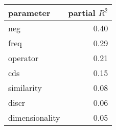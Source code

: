 \begin{tabular}{lr}
\toprule
      parameter &  partial $R^2$ \\
\midrule
            neg &           0.40 \\
           freq &           0.29 \\
       operator &           0.21 \\
            cds &           0.15 \\
     similarity &           0.08 \\
          discr &           0.06 \\
 dimensionality &           0.05 \\
\bottomrule
\end{tabular}

